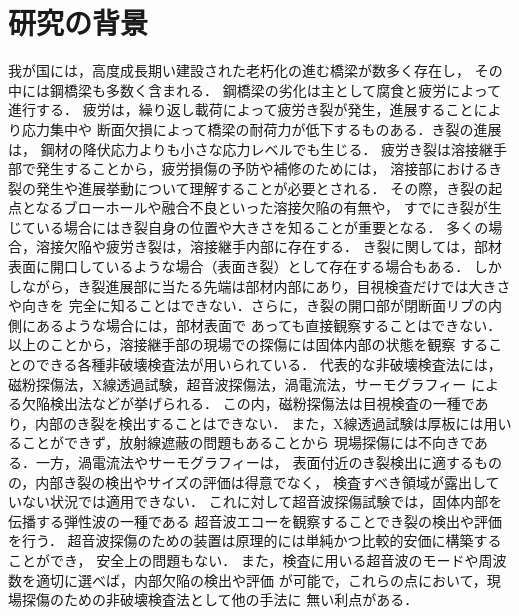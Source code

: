 ﻿%
\section{研究の背景}
%
%
我が国には，高度成長期い建設された老朽化の進む橋梁が数多く存在し，
その中には鋼橋梁も多数く含まれる． 
鋼橋梁の劣化は主として腐食と疲労によって進行する．
疲労は，繰り返し載荷によって疲労き裂が発生，進展することにより応力集中や
断面欠損によって橋梁の耐荷力が低下するものある．き裂の進展は，
鋼材の降伏応力よりも小さな応力レベルでも生じる\cite{Miki}．
疲労き裂は溶接継手部で発生することから，疲労損傷の予防や補修のためには，
溶接部におけるき裂の発生や進展挙動について理解することが必要とされる．
その際，き裂の起点となるブローホールや融合不良といった溶接欠陥の有無や，
すでにき裂が生じている場合にはき裂自身の位置や大きさを知ることが重要となる．
多くの場合，溶接欠陥や疲労き裂は，溶接継手内部に存在する．
き裂に関しては，部材表面に開口しているような場合（表面き裂）として存在する場合もある．
しかしながら，き裂進展部に当たる先端は部材内部にあり，目視検査だけでは大きさや向きを
完全に知ることはできない．さらに，き裂の開口部が閉断面リブの内側にあるような場合には，部材表面で
あっても直接観察することはできない．
以上のことから，溶接継手部の現場での探傷には固体内部の状態を観察
することのできる各種非破壊検査法が用いられている．
代表的な非破壊検査法には，磁粉探傷法，X線透過試験，超音波探傷法，渦電流法，サーモグラフィー
による欠陥検出法などが挙げられる．
この内，磁粉探傷法は目視検査の一種であり，内部のき裂を検出することはできない．
また，X線透過試験は厚板には用いることができず，放射線遮蔽の問題もあることから
現場探傷には不向きである．一方，渦電流法やサーモグラフィーは，
表面付近のき裂検出に適するものの，内部き裂の検出やサイズの評価は得意でなく，
検査すべき領域が露出していない状況では適用できない．
これに対して超音波探傷試験では，固体内部を伝播する弾性波の一種である
超音波エコーを観察することでき裂の検出や評価を行う．
超音波探傷のための装置は原理的には単純かつ比較的安価に構築することができ，
安全上の問題もない．
また，検査に用いる超音波のモードや周波数を適切に選べば，内部欠陥の検出や評価
が可能で，これらの点において，現場探傷のための非破壊検査法として他の手法に
無い利点がある\cite{US}．\\

